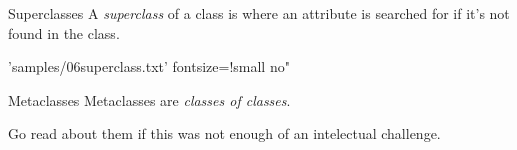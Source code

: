 \documentclass{pyslides}
\begin{document}
\begin{frame}[fragile]{Superclasses}
A \emph{superclass} of a class is where an attribute is searched for if it's not found in the class.

 'samples/06superclass.txt' fontsize=!small no"

\end{frame}

\begin{frame}[fragile]{Metaclasses}
Metaclasses are \emph{classes of classes}.

Go read about them if this was not enough of an intelectual challenge.
\end{frame}
\end{document}
